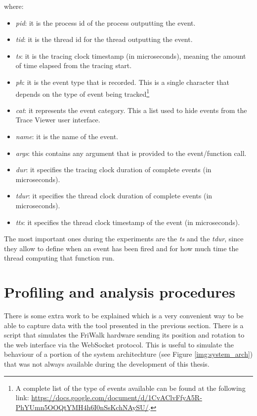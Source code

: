 where:
\begin{itemize}
    \item \emph{pid}: it is the process id of the process outputting the event.
    \item \emph{tid}: it is the thread id for the thread outputting the event.
    \item \emph{ts}: it is the tracing clock timestamp (in microseconds), meaning
        the amount of time elapsed from the tracing start.
    \item \emph{ph}: it is the event type that is recorded. This is a single character
        that depends on the type of event being tracked\footnote{A complete list
        of the type of events available can be found at the following link:
        \url{https://docs.google.com/document/d/1CvAClvFfyA5R-PhYUmn5OOQtYMH4h6I0nSsKchNAySU/}.}
    \item \emph{cat}: it represents the event category. This a list used to hide
        events from the Trace Viewer user interface.
    \item \emph{name}: it is the name of the event.
    \item \emph{args}: this contains any argument that is provided to the event/function
        call.
    \item \emph{dur}: it specifies the tracing clock duration of complete events
        (in microseconds).
    \item \emph{tdur}: it specifies the thread clock duration of complete events
        (in microseconds).
    \item \emph{tts}: it specifies the thread clock timestamp of the event (in
        microseconds).
\end{itemize}

The most important ones during the experiments are the \emph{ts} and the
\emph{tdur}, since they allow to define when an event has been fired and for how
much time the thread computing that function run.


\section{Profiling and analysis procedures}
There is some extra work to be explained which is a very convenient way to be able
to capture data with the tool presented in the previous section. There is a script
that simulates the FriWalk hardware sending its position and rotation to the web
interface via the WebSocket protocol. This is useful to simulate the behaviour of
a portion of the system architechture (see Figure \ref{img:system_arch}) that was
not always available during the development of this thesis.


